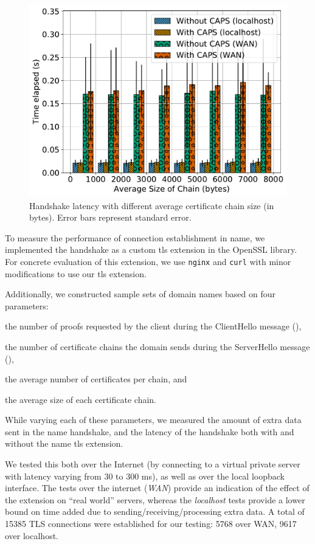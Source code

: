\begin{figure}[t]
  \centering
  \includegraphics[width=\linewidth]{fig/eval_tls_ext/3-time_elapsed_vs_avg_chain_size}
  \caption{Handshake latency with different average certificate chain size (in
  bytes). Error bars represent standard error.}
  \label{fig:evaltlsext:sizechain}
\end{figure}

To measure the performance of connection establishment in \ac{name}, we
implemented the handshake as a custom \ac{tls} extension in the OpenSSL library.
For concrete evaluation of this extension, we use \texttt{nginx} and \texttt{curl} with minor
modifications to use our \ac{tls} extension.

Additionally, we constructed sample sets of domain names based on four parameters:
\begin{inparaenum}
\item the number of proofs requested by the client during the
  ClientHello message (\numlas),
\item the number of certificate chains the domain sends during the ServerHello
  message (\policy),
\item the average number of certificates per chain, and
\item the average size of each certificate chain.
\end{inparaenum}
While varying each of these parameters, we measured the amount of extra data
sent in the \ac{name} handshake, and the latency of the handshake both with and
without the \ac{name} \ac{tls} extension.

We tested this both over the Internet (by connecting to a virtual private server
with latency varying from 30 to 300 ms), as well
as over the local loopback interface. The
tests over the internet (\emph{WAN}) provide an indication of the effect of
the extension on ``real world'' servers, 
whereas the \emph{localhost} tests provide a lower bound on time added due to
sending/receiving/processing extra data. A total of 15385 TLS connections were
established for our testing: 5768 over WAN, 9617 over localhost.

